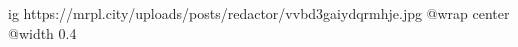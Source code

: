  
 
 
 
 

\ifcmt
  ig https://mrpl.city/uploads/posts/redactor/vvbd3gaiydqrmhje.jpg
  @wrap center
  @width 0.4
\fi
